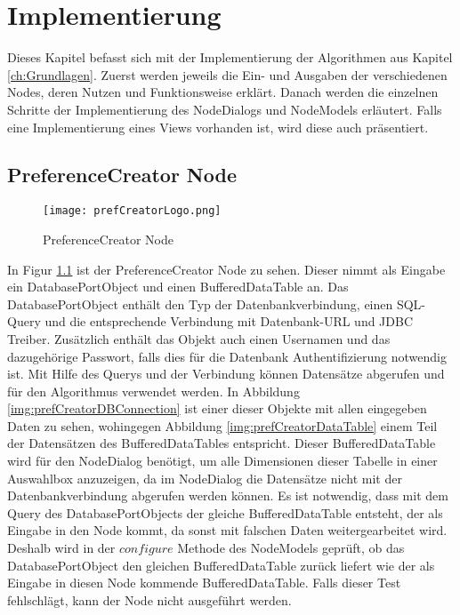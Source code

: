 \chapter{Implementierung}
\label{ch:Implementierung}
Dieses Kapitel befasst sich mit der Implementierung der Algorithmen aus Kapitel \ref{ch:Grundlagen}. Zuerst werden jeweils die Ein- und Ausgaben der verschiedenen Nodes, deren Nutzen und Funktionsweise erklärt. 
Danach werden die einzelnen Schritte der Implementierung des NodeDialogs und NodeModels erläutert. Falls eine Implementierung eines Views vorhanden ist, wird diese auch präsentiert.
\section{PreferenceCreator Node}
\label{ch:Implementierung:sec:prefCreatorNode}
\begin{figure}[H]
	\centering
	\texttt{[image: prefCreatorLogo.png]}
	\caption{PreferenceCreator Node}
	\label{img:prefCreatorLogo}
\end{figure} 

In Figur \ref{img:prefCreatorLogo} ist der PreferenceCreator Node zu sehen. Dieser nimmt als Eingabe ein DatabasePortObject und einen BufferedDataTable an. Das DatabasePortObject enthält den Typ der Datenbankverbindung, einen SQL-Query und die entsprechende Verbindung mit Datenbank-URL und JDBC Treiber. Zusätzlich enthält das Objekt auch einen Usernamen und das dazugehörige Passwort, falls dies für die Datenbank Authentifizierung notwendig ist. Mit Hilfe des Querys und der Verbindung können Datensätze abgerufen und für den Algorithmus verwendet werden. 
In Abbildung \ref{img:prefCreatorDBConnection} ist einer dieser Objekte mit allen eingegeben Daten zu sehen, wohingegen Abbildung \ref{img:prefCreatorDataTable} einem Teil der Datensätzen des BufferedDataTables entspricht. Dieser BufferedDataTable wird für den NodeDialog benötigt, um alle Dimensionen dieser Tabelle in einer Auswahlbox anzuzeigen, da im NodeDialog die Datensätze nicht mit der Datenbankverbindung abgerufen werden können. Es ist notwendig, dass mit dem Query des DatabasePortObjects der gleiche BufferedDataTable entsteht, der als Eingabe in den Node kommt, da sonst mit falschen Daten weitergearbeitet wird. Deshalb wird in der $configure$ Methode des NodeModels geprüft, ob das DatabasePortObject den gleichen BufferedDataTable zurück liefert wie der als Eingabe in diesen Node kommende BufferedDataTable. Falls dieser Test fehlschlägt, kann der Node nicht ausgeführt werden. 

